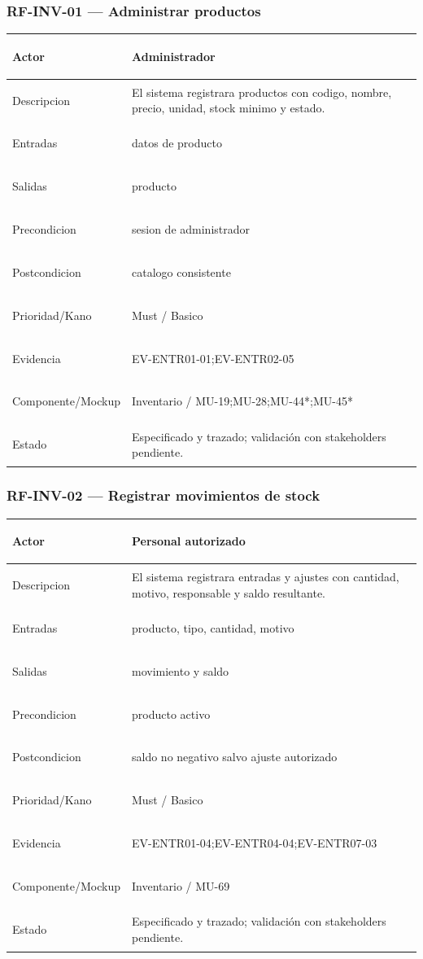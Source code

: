 \documentclass[11pt,a4paper,twoside]{article}
\begin{document}
\subsubsection{RF-INV-01 — Administrar productos}
\begingroup
\renewcommand{\arraystretch}{1.12}
\setlength{\tabcolsep}{5pt}
\begin{tabularx}{\textwidth}{|>{\bfseries\raggedright\arraybackslash}p{3.35cm}|>{\raggedright\arraybackslash}X|}
\hline
Actor & Administrador \\ \hline
Descripcion & El sistema registrara productos con codigo, nombre, precio, unidad, stock minimo y estado. \\ \hline
Entradas & datos de producto \\ \hline
Salidas & producto \\ \hline
Precondicion & sesion de administrador \\ \hline
Postcondicion & catalogo consistente \\ \hline
Prioridad/Kano & Must / Basico \\ \hline
Evidencia & EV-ENTR01-01;EV-ENTR02-05 \\ \hline
Componente/Mockup & Inventario / MU-19;MU-28;MU-44*;MU-45* \\ \hline
Estado & Especificado y trazado; validación con stakeholders pendiente. \\ \hline
\end{tabularx}
\endgroup

\subsubsection{RF-INV-02 — Registrar movimientos de stock}
\begingroup
\renewcommand{\arraystretch}{1.12}
\setlength{\tabcolsep}{5pt}
\begin{tabularx}{\textwidth}{|>{\bfseries\raggedright\arraybackslash}p{3.35cm}|>{\raggedright\arraybackslash}X|}
\hline
Actor & Personal autorizado \\ \hline
Descripcion & El sistema registrara entradas y ajustes con cantidad, motivo, responsable y saldo resultante. \\ \hline
Entradas & producto, tipo, cantidad, motivo \\ \hline
Salidas & movimiento y saldo \\ \hline
Precondicion & producto activo \\ \hline
Postcondicion & saldo no negativo salvo ajuste autorizado \\ \hline
Prioridad/Kano & Must / Basico \\ \hline
Evidencia & EV-ENTR01-04;EV-ENTR04-04;EV-ENTR07-03 \\ \hline
Componente/Mockup & Inventario / MU-69 \\ \hline
Estado & Especificado y trazado; validación con stakeholders pendiente. \\ \hline
\end{tabularx}
\endgroup
\end{document}
